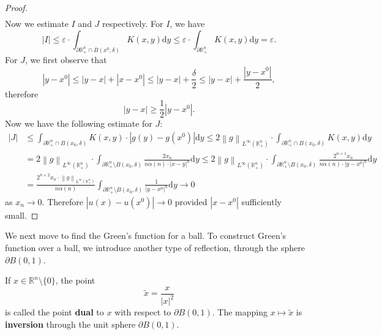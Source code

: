 \begin{proof}
$$\begin{aligned}
\end{aligned}
$$
Now we estimate $I$ and $J$ respectively. For $I$, we have 
$$
\left| I \right|\le \varepsilon \cdot \int_{\partial \mathbb{R} _{+}^{n}\cap B\left( x^0,\delta \right)}{K\left( x,y \right) \mathrm{d}y}\le \varepsilon \cdot \int_{\partial \mathbb{R} _{+}^{n}}{K\left( x,y \right) \mathrm{d}y}=\varepsilon .
$$
For $J$, we first observe that 
$$
\left| y-x^0 \right|\le \left| y-x \right|+\left| x-x^0 \right|\le \left| y-x \right|+\frac{\delta}{2}\le \left| y-x \right|+\frac{\left| y-x^0 \right|}{2},
$$
therefore 
\begin{equation}\label{1.22}
\left| y-x \right|\ge \frac{1}{2}\left| y-x^0 \right|.
\end{equation}
Now we have the following estimate for $J$: 
$$
\begin{aligned}
\left| J \right|&\le \int_{\partial \mathbb{R} _{+}^{n}\cap B\left( x_0,\delta \right)}{K\left( x,y \right) \cdot \left| g\left( y \right) -g\left( x^0 \right) \right|\mathrm{d}y}\le 2\left\| g \right\| _{L^{\infty}\left( \mathbb{R} _{+}^{n} \right)}\cdot \int_{\partial \mathbb{R} _{+}^{n}\cap B\left( x_0,\delta \right)}{K\left( x,y \right) \mathrm{d}y}
\\
&=2\left\| g \right\| _{L^{\infty}\left( \mathbb{R} _{+}^{n} \right)}\cdot \int_{\partial \mathbb{R} _{+}^{n}\setminus B\left( x_0,\delta \right)}{\frac{2x_n}{n\alpha \left( n \right) \cdot \left| x-y \right|^n}\mathrm{d}y}\le 2\left\| g \right\| _{L^{\infty}\left( \mathbb{R} _{+}^{n} \right)}\cdot \int_{\partial \mathbb{R} _{+}^{n}\setminus B\left( x_0,\delta \right)}{\frac{2^{n+1}x_n}{n\alpha \left( n \right) \cdot \left| y-x^0 \right|^n}\mathrm{d}y}
\\
&=\frac{2^{n+2}x_n\cdot \left\| g \right\| _{L^{\infty}\left( \mathbb{R} _{+}^{n} \right)}}{n\alpha \left( n \right)}\int_{\partial \mathbb{R} _{+}^{n}\setminus B\left( x_0,\delta \right)}{\frac{1}{\left| y-x^0 \right|^n}\mathrm{d}y}\rightarrow 0
\end{aligned}
$$
as $x_n\to 0$. Therefore $|u(x)-u(x^0)|\to 0$ provided $|x-x^0|$ sufficiently small.
\end{proof}
We next move to find the Green's function for a ball. To construct Green's function over a ball, we introduce another type of reflection, through the sphere $\partial B(0,1)$.
\begin{definition}
If $x\in\mathbb{R}^n\setminus\{0\}$, the point 
$$
\widetilde{x}=\frac{x}{\left| x \right|^2}
$$
is called the point \textbf{dual} to $x$ with respect to $\partial B(0,1)$. The mapping $x\mapsto \widetilde{x}$ is \textbf{inversion} through the unit sphere $\partial B(0,1)$.
\end{definition}
